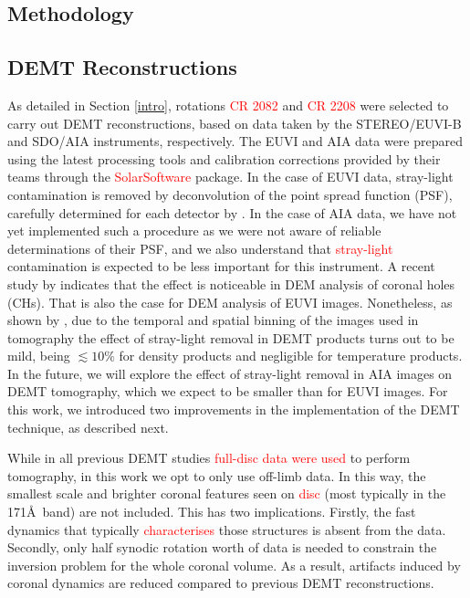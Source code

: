 \documentclass[namedreferences]{solarphysics}
\def\edit#1{\textcolor{Red}{#1}}
\begin{document}
\begin{article}
\section{Methodology}\label{meto}   

\subsection{{DEMT Reconstructions}}\label{demt}

{As detailed in Section \ref{intro}, rotations \edit{CR 2082} and \edit{CR 2208} were selected to carry out DEMT reconstructions, based on data taken by the STEREO/EUVI-B and SDO/AIA instruments, respectively.} The EUVI and AIA data were prepared using the latest processing tools and calibration corrections provided by their teams through the \edit{SolarSoftware} package. {In the case of EUVI data, stray-light contamination is removed by deconvolution of the point spread function (PSF), carefully determined for each detector by \citet{shearer_2012}. In the case of AIA data, we have not yet implemented such a procedure as we were not aware of reliable determinations of their PSF, and we also understand that \edit{stray-light} contamination is expected to be less important for this instrument. A recent study by \citet{saqri_2020} indicates that the effect is noticeable in DEM analysis of coronal holes (CHs). That is also the case for DEM analysis of EUVI images. Nonetheless, as shown by \citet{lloveras_2017}, due to the temporal and spatial binning of the images used in tomography the effect of stray-light removal in DEMT products turns out to be mild, being $\lesssim 10\%$ for density products and negligible for temperature products. In the future, we will explore the effect of stray-light removal in AIA images on DEMT tomography, which we expect to be smaller than for EUVI images.} For this work, we introduced two improvements in the implementation of the DEMT technique, as described next.

{While in all previous DEMT studies \edit{full-disc data were used} to perform tomography, in this work we {opt} to only use off-limb data. In this way, the smallest scale and brighter coronal features seen on \edit{disc} (most typically in the 171\AA\ band) are not included. This has two implications. Firstly, the fast dynamics that typically \edit{characterises} those structures is absent from the data. Secondly, only half synodic rotation worth of data is needed to constrain the inversion problem for the whole coronal volume. As a result, {artifacts induced by coronal dynamics} are reduced compared to previous DEMT reconstructions.}


\end{article}
\end{document}
